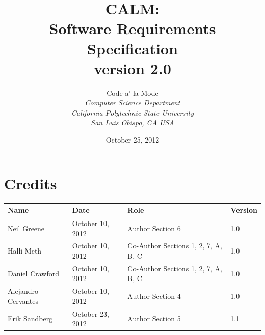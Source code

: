 \documentclass[12pt,oneside,letterpaper]{article}
\begin{document}
\title{\bfseries CALM: \\
Software Requirements Specification\\
version 2.0}

\author {
\large{Code a' la Mode}\\
\emph{Computer Science Department}\\
\emph{California Polytechnic State University}\\
\emph{San Luis Obispo, CA USA}\\
}

\date{October 25, 2012}
\maketitle \thispagestyle{empty}

\pagebreak
\tableofcontents



\section*{Credits}
\begin{tabular}{|l|l|p{2.5in}|l|}
\hline
\textbf{Name}&\textbf{Date}&\textbf{Role}&\textbf{Version}\\
\hline
Neil Greene & October 10, 2012 & Author Section 6& 1.0\\
\hline
Halli Meth & October 10, 2012 & Co-Author Sections 1, 2, 7, A, B, C & 1.0\\
\hline
Daniel Crawford & October 10, 2012 & Co-Author Sections 1, 2, 7, A, B, C & 1.0\\
\hline
Alejandro Cervantes & October 10, 2012 & Author Section 4 & 1.0\\
\hline
Erik Sandberg & October 23, 2012 & Author Section 5 & 1.1\\
\hline
\end{tabular}
\end{document}
